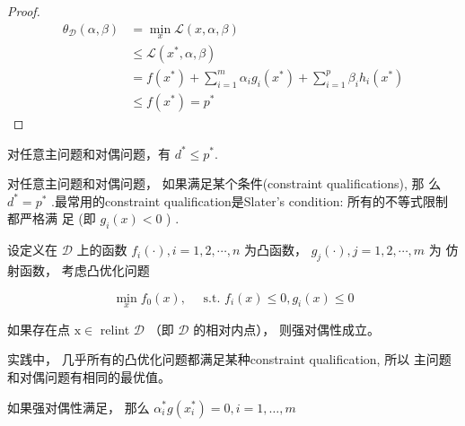 \begin{proof}
    \begin{equation} \begin{aligned} \theta_{\mathcal{D}}(\alpha, \beta) &=\min _{x} \mathcal{L}(x, \alpha, \beta) \\ & \leqslant \mathcal{L}\left(x^{*}, \alpha, \beta\right) \\ &=f\left(x^{*}\right)+\sum_{i=1}^{m} \alpha_{i} g_{i}\left(x^{*}\right)+\sum_{i=1}^{p} \beta_{i} h_{i}\left(x^{*}\right) \\ & \leqslant f\left(x^{*}\right)=p^{*} \end{aligned} \end{equation}
\end{proof}

\begin{theorem}[弱对偶性]
    对任意主问题和对偶问题，有 $ d^{*} \leqslant p^{*} $.
\end{theorem}

\begin{theorem}[强对偶性]
    对任意主问题和对偶问题， 如果满足某个条件(constraint qualifications), 那 么 $ d^{*}=p^{*} $ .最常用的constraint qualification是Slater's condition: 所有的不等式限制都严格满 足 (即 $ g_{i}(x)<0 $ ) .
\end{theorem}

\begin{theorem}[Slater 条件]
    设定义在 $ \mathcal{D} $ 上的函数 $ f_{i}(\cdot), i=1,2, \cdots, n $ 为凸函数， $ g_{j}(\cdot), j=1,2, \cdots, m $ 为 仿射函数， 考虑凸优化问题

    \begin{equation}
    \min _{{x}} f_{0}({x}), \quad \text { s.t. } f_{i}({x}) \leq 0, g_{i}({x}) \leq 0
    \end{equation}

    如果存在点 $ \mathrm{x} \in $ relint $ \mathcal{D} $ （即 $ \mathcal{D} $ 的相对内点）， 则强对偶性成立。
\end{theorem}

实践中， 几乎所有的凸优化问题都满足某种constraint qualification, 所以 主问题和对偶问题有相同的最优值。

\begin{theorem}
    如果强对偶性满足， 那么 $ \alpha_{i}^{*} g\left(x_{i}^{*}\right)=0, i=1, \ldots, m $
    
\end{theorem}

